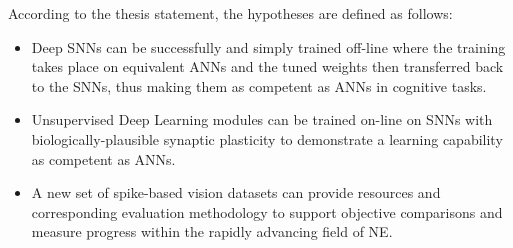 According to the thesis statement, the hypotheses are defined as follows: 
\begin{itemize}
%

	\item 
	Deep SNNs can be successfully and simply trained off-line where the training takes place on equivalent ANNs and the tuned weights then transferred back to the SNNs, thus making them as competent as ANNs in cognitive tasks.


	\item 
	Unsupervised Deep Learning modules can be trained on-line on SNNs with biologically-plausible synaptic plasticity to demonstrate a learning capability as competent as ANNs.


	\item 
	A new set of spike-based vision datasets can provide resources and corresponding evaluation methodology to support objective comparisons and measure progress within the rapidly advancing field of NE.

\end{itemize}



